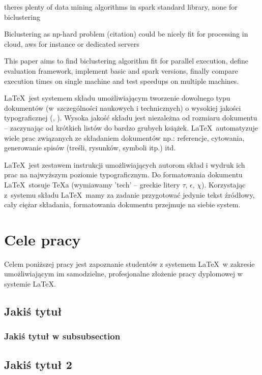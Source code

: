 theres plenty of data mining algorithms in spark standard library, none for biclustering

Biclustering as np-hard problem (citation) could be nicely fit for processing in cloud, aws for instance or dedicated servers

This paper aims to find biclustering algorithm fit for parallel execution, define evaluation framework, implement basic and spark versions, finally compare execution times on single machine and test speedups on multiple machines.



\LaTeX~jest systemem składu umożliwiającym tworzenie dowolnego typu dokumentów (w~szczególności naukowych i technicznych) o wysokiej jakości typograficznej (\cite{Dil00}, \cite{Lam92}). Wysoka jakość składu jest niezależna od rozmiaru dokumentu -- zaczynając od krótkich listów do bardzo grubych książek. \LaTeX~automatyzuje wiele prac związanych ze składaniem dokumentów np.: referencje, cytowania, generowanie spisów (treśli, rysunków, symboli itp.) itd.

\LaTeX~jest zestawem instrukcji umożliwiających autorom skład i wydruk ich prac na najwyższym poziomie typograficznym. Do formatowania dokumentu \LaTeX~stosuje \TeX a (wymiawamy 'tech' -- greckie litery $\tau$, $\epsilon$, $\chi$). Korzystając z~systemu składu \LaTeX~mamy za zadanie przygotować jedynie tekst źródłowy, cały ciężar składania, formatowania dokumentu przejmuje na siebie system.


\section{Cele pracy}
\label{sec:celePracy}


Celem poniższej pracy jest zapoznanie studentów z systemem \LaTeX~w zakresie umożliwiającym im samodzielne, profesjonalne złożenie pracy dyplomowej w systemie \LaTeX.

\subsection{Jakiś tytuł}

\subsubsection{Jakiś tytuł w subsubsection}


\subsection{Jakiś tytuł 2}

